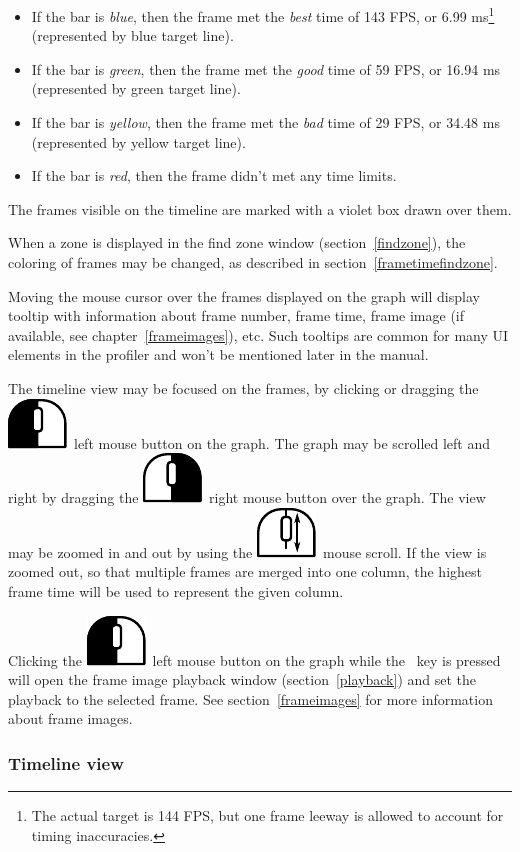 \documentclass[hidelinks,titlepage,a4paper]{article}
\newcommand{\LMB}{\includegraphics[height=.8\baselineskip]{icons/lmb}}
\newcommand{\RMB}{\includegraphics[height=.8\baselineskip]{icons/rmb}}
\newcommand{\Scroll}{\includegraphics[height=.8\baselineskip]{icons/scroll}}
\begin{document}
\begin{itemize}
\item If the bar is \emph{blue}, then the frame met the \emph{best} time of 143 FPS, or 6.99 \si{\milli\second}\footnote{The actual target is 144 FPS, but one frame leeway is allowed to account for timing inaccuracies.} (represented by blue target line).
\item If the bar is \emph{green}, then the frame met the \emph{good} time of 59 FPS, or 16.94 \si{\milli\second} (represented by green target line).
\item If the bar is \emph{yellow}, then the frame met the \emph{bad} time of 29 FPS, or 34.48 \si{\milli\second} (represented by yellow target line).
\item If the bar is \emph{red}, then the frame didn't met any time limits.
\end{itemize}

The frames visible on the timeline are marked with a violet box drawn over them.

When a zone is displayed in the find zone window (section~\ref{findzone}), the coloring of frames may be changed, as described in section~\ref{frametimefindzone}.

Moving the \faMousePointer{} mouse cursor over the frames displayed on the graph will display tooltip with information about frame number, frame time, frame image (if available, see chapter~\ref{frameimages}), etc. Such tooltips are common for many UI elements in the profiler and won't be mentioned later in the manual.

The timeline view may be focused on the frames, by clicking or dragging the \LMB{}~left mouse button on the graph. The graph may be scrolled left and right by dragging the \RMB{}~right mouse button over the graph. The view may be zoomed in and out by using the \Scroll{}~mouse scroll. If the view is zoomed out, so that multiple frames are merged into one column, the highest frame time will be used to represent the given column.

Clicking the \LMB{}~left mouse button on the graph while the \keys{\ctrl}~key is pressed will open the frame image playback window (section~\ref{playback}) and set the playback to the selected frame. See section~\ref{frameimages} for more information about frame images.

\subsubsection{Timeline view}
\end{document}
